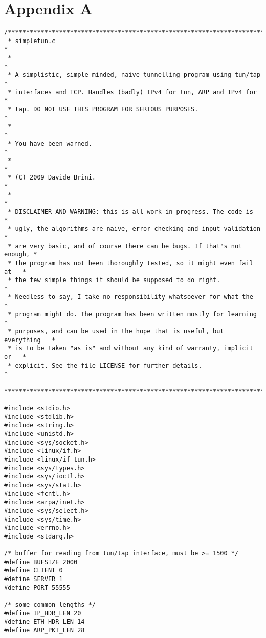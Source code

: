 \documentclass[a4paper,12pt]{article}
\begin{document}
	\section{Appendix A}
	\label{ch:AppA}
	\begin{verbatim}
/**************************************************************************
 * simpletun.c                                                            *
 *                                                                        *
 * A simplistic, simple-minded, naive tunnelling program using tun/tap    *
 * interfaces and TCP. Handles (badly) IPv4 for tun, ARP and IPv4 for     *
 * tap. DO NOT USE THIS PROGRAM FOR SERIOUS PURPOSES.                     *
 *                                                                        *
 * You have been warned.                                                  *
 *                                                                        *
 * (C) 2009 Davide Brini.                                                 *
 *                                                                        *
 * DISCLAIMER AND WARNING: this is all work in progress. The code is      *
 * ugly, the algorithms are naive, error checking and input validation    *
 * are very basic, and of course there can be bugs. If that's not enough, *
 * the program has not been thoroughly tested, so it might even fail at   *
 * the few simple things it should be supposed to do right.               *
 * Needless to say, I take no responsibility whatsoever for what the      *
 * program might do. The program has been written mostly for learning     *
 * purposes, and can be used in the hope that is useful, but everything   *
 * is to be taken "as is" and without any kind of warranty, implicit or   *
 * explicit. See the file LICENSE for further details.                    *
 *************************************************************************/ 

#include <stdio.h>
#include <stdlib.h>
#include <string.h>
#include <unistd.h>
#include <sys/socket.h>
#include <linux/if.h>
#include <linux/if_tun.h>
#include <sys/types.h>
#include <sys/ioctl.h>
#include <sys/stat.h>
#include <fcntl.h>
#include <arpa/inet.h> 
#include <sys/select.h>
#include <sys/time.h>
#include <errno.h>
#include <stdarg.h>

/* buffer for reading from tun/tap interface, must be >= 1500 */
#define BUFSIZE 2000   
#define CLIENT 0
#define SERVER 1
#define PORT 55555

/* some common lengths */
#define IP_HDR_LEN 20
#define ETH_HDR_LEN 14
#define ARP_PKT_LEN 28


\end{verbatim}
\end{document}
